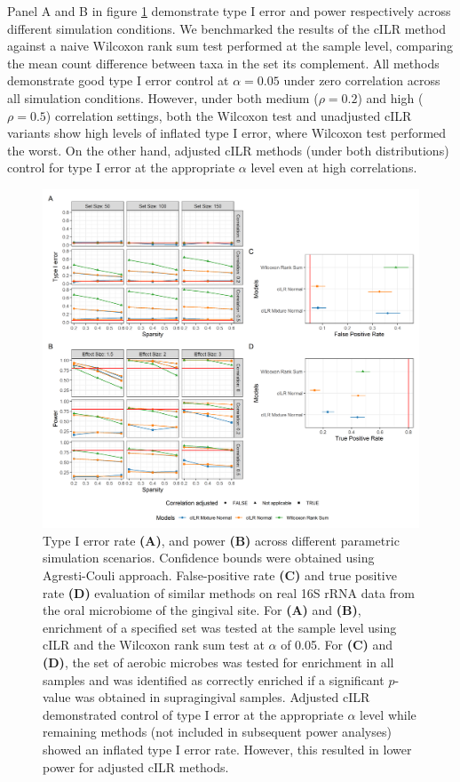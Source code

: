 \documentclass{article}
\begin{document}
Panel A and B in figure \ref{fig:2} demonstrate type I error and power respectively across different simulation conditions. We benchmarked the results of the cILR method against a naive Wilcoxon rank sum test performed at the sample level, comparing the mean count difference between taxa in the set its complement. All methods demonstrate good type I error control at $\alpha = 0.05$ under zero correlation across all simulation conditions. However, under both medium ($\rho = 0.2$) and high ($\rho = 0.5$) correlation settings, both the Wilcoxon test and unadjusted cILR variants show high levels of inflated type I error, where Wilcoxon test performed the worst. On the other hand, adjusted cILR methods (under both distributions) control for type I error at the appropriate $\alpha$ level even at high correlations. 

\begin{figure}[H]
    \centering
    \includegraphics[width=\textwidth]{figures/sim_data_ss_hypo.png}
    \caption{Type I error rate \textbf{(A)}, and power \textbf{(B)} across different parametric simulation scenarios. Confidence bounds were obtained using Agresti-Couli \cite{agresti1998} approach. False-positive rate \textbf{(C)} and true positive rate \textbf{(D)} evaluation of similar methods on real 16S rRNA data from the oral microbiome of the gingival site. For \textbf{(A)} and \textbf{(B)}, enrichment of a specified set was tested at the sample level using cILR and the Wilcoxon rank sum test at $\alpha$ of 0.05. For \textbf{(C)} and \textbf{(D)}, the set of aerobic microbes was tested for enrichment in all samples and was identified as correctly enriched if a significant $p$-value was obtained in supragingival samples. Adjusted cILR demonstrated control of type I error at the appropriate $\alpha$ level while remaining methods (not included in subsequent power analyses) showed an inflated type I error rate. However, this resulted in lower power for adjusted cILR methods.}
    \label{fig:2}
\end{figure}
\end{document}
